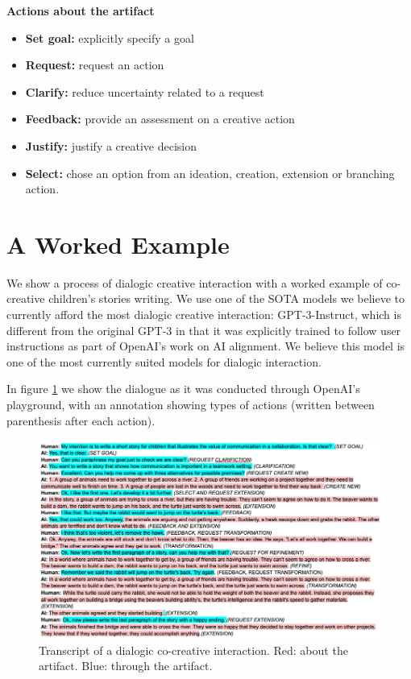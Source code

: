 \documentclass[acmlarge, nonacm, screen]{acmart} %
\begin{document}
  \textbf{Actions about the artifact}
  
\begin{itemize}
  \item \relax \textbf{Set goal:} explicitly specify a goal
  \item \relax \textbf{Request:} request an action
  \item \relax \textbf{Clarify:} reduce uncertainty related to a request
  \item \relax \textbf{Feedback:} provide an assessment on a creative action
  \item \relax \textbf{Justify:} justify a creative decision
  \item \relax \textbf{Select:} chose an option from an ideation, creation, extension or branching action.
\end{itemize}

\section{A Worked Example}
We show a process of dialogic creative interaction with a worked example of co-creative children's stories writing. We use one of the SOTA models we believe to currently afford the most dialogic creative interaction: GPT-3-Instruct, which is different from the original GPT-3 in that it was explicitly trained to follow user instructions as part of OpenAI's work on AI alignment. We believe this model is one of the most currently suited models for dialogic interaction.

In figure \ref{fig:transcript} we show the dialogue as it was conducted through OpenAI's playground, with an annotation showing types of actions (written between parenthesis after each action).

\begin{figure}
  \includegraphics[width=\linewidth]{./TRANSCRIPT.png}
  \caption{Transcript of a dialogic co-creative interaction. Red: about the artifact. Blue: through the artifact.}
  \label{fig:transcript}
\end{figure}
\end{document}
